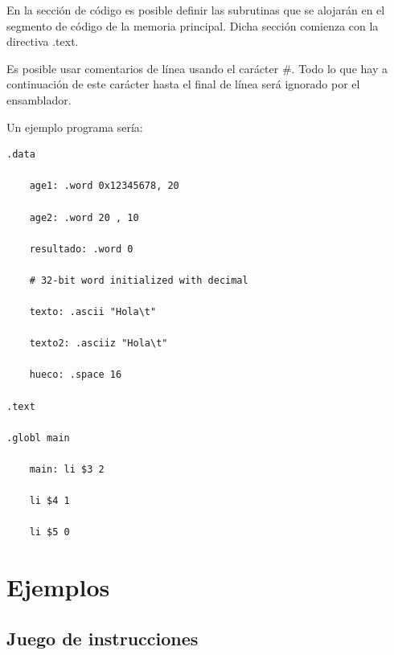 En la sección de código es posible definir las subrutinas que se alojarán en el segmento de código de la memoria principal. Dicha sección comienza con la directiva .text.

Es posible usar comentarios de línea usando el carácter \#. Todo lo que hay a continuación de este carácter hasta el final de línea será ignorado por el ensamblador.

\vspace{4cm}

Un ejemplo programa sería:

\begin{lstlisting}
.data

	age1: .word 0x12345678, 20

	age2: .word 20 , 10

	resultado: .word 0

	# 32-bit word initialized with decimal

	texto: .ascii "Hola\t"

	texto2: .asciiz "Hola\t"

	hueco: .space 16

.text

.globl main

	main: li $3 2

	li $4 1

	li $5 0
\end{lstlisting}

\clearpage

\section*{Ejemplos}

\subsection*{Juego de instrucciones}

